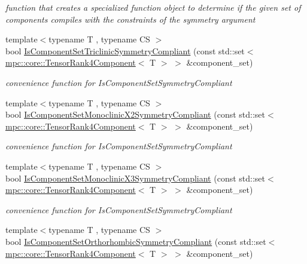 \begin{DoxyCompactItemize}
\begin{DoxyCompactList}\small\item\em function that creates a specialized function object to determine if the given set of components compiles with the constraints of the symmetry argument \end{DoxyCompactList}\item 
{\footnotesize template$<$typename T , typename CS $>$ }\\bool \mbox{\hyperlink{namespacempc_1_1core_a3112d520d8ca2505f59481a872c173e2}{Is\+Component\+Set\+Triclinic\+Symmetry\+Compliant}} (const std\+::set$<$ \mbox{\hyperlink{namespacempc_1_1core_ac3a232afc7c680d580628e834030482f}{mpc\+::core\+::\+Tensor\+Rank4\+Component}}$<$ T $>$ $>$ \&component\+\_\+set)
\begin{DoxyCompactList}\small\item\em convenience function for Is\+Component\+Set\+Symmetry\+Compliant \end{DoxyCompactList}\item 
{\footnotesize template$<$typename T , typename CS $>$ }\\bool \mbox{\hyperlink{namespacempc_1_1core_ac121083b9dbf6e9a9e29c41aed0fd68a}{Is\+Component\+Set\+Monoclinic\+X2\+Symmetry\+Compliant}} (const std\+::set$<$ \mbox{\hyperlink{namespacempc_1_1core_ac3a232afc7c680d580628e834030482f}{mpc\+::core\+::\+Tensor\+Rank4\+Component}}$<$ T $>$ $>$ \&component\+\_\+set)
\begin{DoxyCompactList}\small\item\em convenience function for Is\+Component\+Set\+Symmetry\+Compliant \end{DoxyCompactList}\item 
{\footnotesize template$<$typename T , typename CS $>$ }\\bool \mbox{\hyperlink{namespacempc_1_1core_a03b3facbec930564c01185edc6834398}{Is\+Component\+Set\+Monoclinic\+X3\+Symmetry\+Compliant}} (const std\+::set$<$ \mbox{\hyperlink{namespacempc_1_1core_ac3a232afc7c680d580628e834030482f}{mpc\+::core\+::\+Tensor\+Rank4\+Component}}$<$ T $>$ $>$ \&component\+\_\+set)
\begin{DoxyCompactList}\small\item\em convenience function for Is\+Component\+Set\+Symmetry\+Compliant \end{DoxyCompactList}\item 
{\footnotesize template$<$typename T , typename CS $>$ }\\bool \mbox{\hyperlink{namespacempc_1_1core_a636ef48d9715e8bbe399606d11229114}{Is\+Component\+Set\+Orthorhombic\+Symmetry\+Compliant}} (const std\+::set$<$ \mbox{\hyperlink{namespacempc_1_1core_ac3a232afc7c680d580628e834030482f}{mpc\+::core\+::\+Tensor\+Rank4\+Component}}$<$ T $>$ $>$ \&component\+\_\+set)

\end{DoxyCompactItemize}
